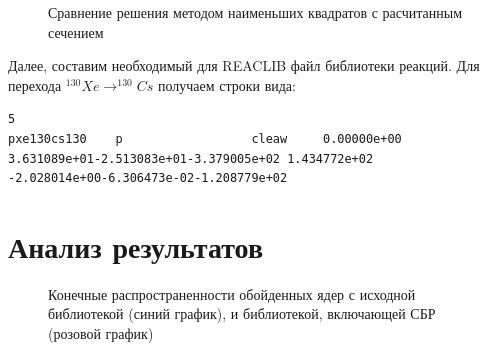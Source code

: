 \documentclass[14pt, a4paper]{article}
\numberwithin{figure}{section}
\numberwithin{equation}{section}
\begin{document}
\begin{figure}[ht]
	\caption{Сравнение решения методом наименьших квадратов с расчитанным сечением}
	\label{ris:2}
\end{figure}

Далее, составим необходимый для REACLIB файл библиотеки реакций. Для перехода $^{130}Xe \to ^{130}Cs$ получаем строки вида: 

\begin{lstlisting}[label={lst:label}]
5
pxe130cs130    p                  cleaw     0.00000e+00          
3.631089e+01-2.513083e+01-3.379005e+02 1.434772e+02                      
-2.028014e+00-6.306473e-02-1.208779e+02                                   

\end{lstlisting}


\section{Анализ результатов}

\begin{figure}[ht]
	\caption{Конечные распространенности обойденных ядер с исходной библиотекой (синий график), и библиотекой, включающей СБР (розовой график)}
	\label{ris:result}
\end{figure}
\end{document}
